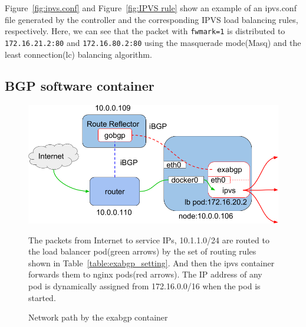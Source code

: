 Figure~\ref{fig:ipvs.conf} and Figure~\ref{fig:IPVS rule} show an example of an ipvs.conf file 
generated by the controller and the corresponding IPVS load balancing rules, respectively.
Here, we can see that the packet with {\tt fwmark=1}\cite{BertHubert2002} is distributed 
to {\tt 172.16.21.2:80} and {\tt 172.16.80.2:80} 
using the masquerade mode(Masq) and 
the least connection(lc)\cite{Zhang2000} balancing algorithm.

\subsection{BGP software container}\label{sec:bgp}

\begin{figure}[tb]
  \begin{center}
    \includegraphics[width=0.8\columnwidth]{Figs/exabgp}
    \caption{Network path by the exabgp container}
    \label{fig:exabgp_schem}
  
    \parbox[c]{0.9\columnwidth}{
      The packets from Internet to service IPs, 10.1.1.0/24 are routed to the load balancer pod(green arrows) by the set of routing rules shown in Table~\ref{table:exabgp_setting}.
      And then the ipvs container forwards them to nginx pods(red arrows).
      The IP address of any pod is dynamically assigned from 172.16.0.0/16 when the pod is started. 
    }
  \end{center}
\end{figure}

